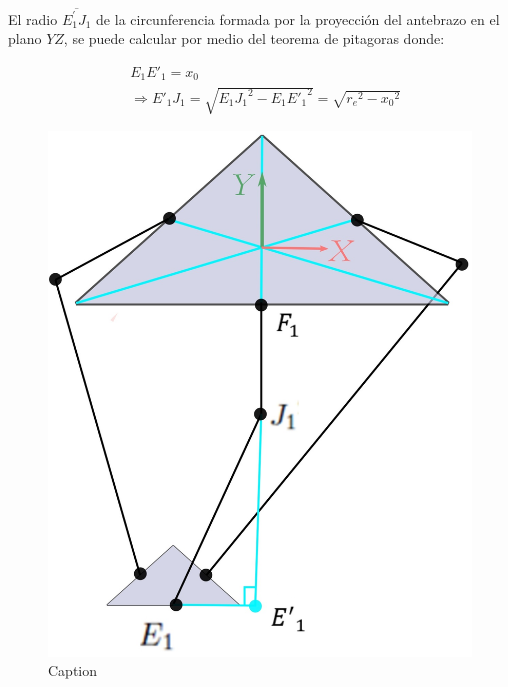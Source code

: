         El radio  $\overline{E^{'}_{1}J_{1}}$ de la circunferencia formada por la proyección del antebrazo en el plano $YZ$, se puede calcular por medio del teorema de pitagoras donde:
        
        \begin{align*}
            &E_1E'_1=x_0\\
            &\Longrightarrow E'_1J_1=\sqrt{E_1{J_1}^{2} - E_1{E'_1}^{2}} = \sqrt{{r_e}^{2}-{x_0}^{2}}
        \end{align*}
        
        
        \begin{figure}[htb]
            \centering
            \includegraphics[width=0.7\linewidth]{Main/Chapter4/Images4/DIBUJO12.JPG}
            \caption{Caption}
            \label{fig:ANEXO_MA_C_POS_7}
        \end{figure}      
        
     \newpage
         
